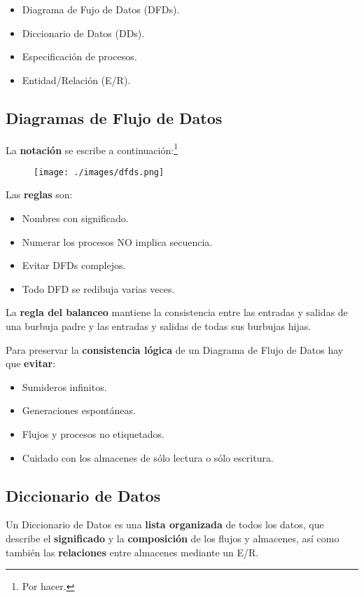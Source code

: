\begin{itemize}[noitemsep]
\item Diagrama de Fujo de Datos (DFDs).
\item Diccionario de Datos (DDs).
\item Especificación de procesos.
\item Entidad/Relación (E/R).
\end{itemize}

\subsection{Diagramas de Flujo de Datos} %
La \textbf{notación} se escribe a continuación:\footnote{Por hacer.}

\begin{figure}[H]
  \texttt{[image: ./images/dfds.png]}
\end{figure}

Las \textbf{reglas} son:

\begin{itemize}[noitemsep]
\item Nombres con significado.
\item Numerar los procesos NO implica secuencia.
\item Evitar DFDs complejos.
\item Todo DFD se redibuja varias veces.
\end{itemize}

La \textbf{regla del balanceo} mantiene la consistencia entre las entradas y salidas de una burbuja padre y las entradas y salidas de todas sus burbujas hijas.

Para preservar la \textbf{consistencia lógica} de un Diagrama de Flujo de Datos hay que \textbf{evitar}:

\begin{itemize}[noitemsep]
\item Sumideros infinitos.
\item Generaciones espontáneas.
\item Flujos y procesos no etiquetados.
\item Cuidado con los almacenes de sólo lectura o sólo escritura.
\end{itemize}


\subsection{Diccionario de Datos} %
Un Diccionario de Datos es una \textbf{lista organizada} de todos los datos, que describe el \textbf{significado} y la \textbf{composición} de los flujos y almacenes, así como también las \textbf{relaciones} entre almacenes mediante un E/R.

